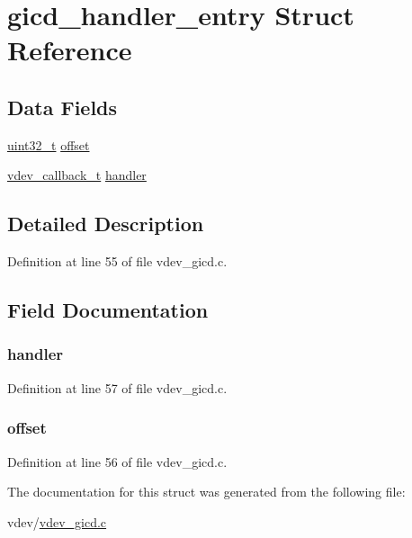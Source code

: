 \hypertarget{structgicd__handler__entry}{\section{gicd\-\_\-handler\-\_\-entry \-Struct \-Reference}
\label{structgicd__handler__entry}
}
\subsection*{\-Data \-Fields}
\begin{DoxyCompactItemize}
\item 
\hyperlink{arch__types_8h_a435d1572bf3f880d55459d9805097f62}{uint32\-\_\-t} \hyperlink{structgicd__handler__entry_a894bdfa2d603d8343f8ef01dda6fcd23}{offset}
\item 
\hyperlink{vdev_8h_aeaabc2529ee76704e7c51336e1caeec4}{vdev\-\_\-callback\-\_\-t} \hyperlink{structgicd__handler__entry_a42fd42fb5449cd6a28b4dc22e97b136a}{handler}
\end{DoxyCompactItemize}


\subsection{\-Detailed \-Description}


\-Definition at line 55 of file vdev\-\_\-gicd.\-c.



\subsection{\-Field \-Documentation}
\hypertarget{structgicd__handler__entry_a42fd42fb5449cd6a28b4dc22e97b136a}{
\subsubsection[{handler}]{ {\bf handler}}}\label{structgicd__handler__entry_a42fd42fb5449cd6a28b4dc22e97b136a}


\-Definition at line 57 of file vdev\-\_\-gicd.\-c.

\hypertarget{structgicd__handler__entry_a894bdfa2d603d8343f8ef01dda6fcd23}{
\subsubsection[{offset}]{ {\bf offset}}}\label{structgicd__handler__entry_a894bdfa2d603d8343f8ef01dda6fcd23}


\-Definition at line 56 of file vdev\-\_\-gicd.\-c.



\-The documentation for this struct was generated from the following file\-:\begin{DoxyCompactItemize}
\item 
vdev/\hyperlink{vdev__gicd_8c}{vdev\-\_\-gicd.\-c}\end{DoxyCompactItemize}
